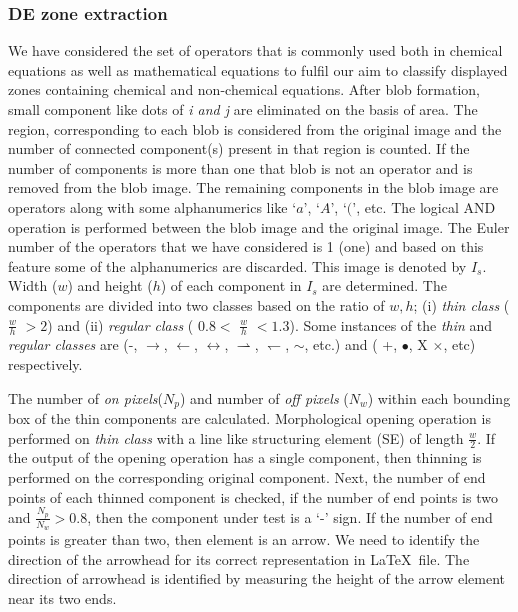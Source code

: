 \subsubsection{DE zone extraction} 
\label{DEZONE}
We have considered the set of operators that is commonly used both in chemical equations as well as mathematical equations to fulfil our aim to classify displayed zones containing chemical and non-chemical equations. After blob formation, small component like dots of \emph{i and j} are eliminated on the basis of area. The region, corresponding to each blob is considered from the original image and the
number of connected component(s) present in that region is counted. If the number of components is more than one that blob is not an operator and is removed from the  blob image.
The remaining components in the blob image are operators along with some alphanumerics like $‘a’$, $‘A’$, $‘(’$, etc. The logical AND operation is performed between the blob image and the original image. The Euler number of the operators that we have considered is 1 (one) and based on this feature some of the alphanumerics are discarded. This image is denoted by $I_s$.
Width ($w$) and height ($h$) of each component in $I_s$ are determined. The components  are divided into two classes based on the ratio of $w, h$;
(i) {\em thin class} ($\frac{w}{h}$ $> 2$) and (ii) {\em regular class} ( $0.8 <$ $\frac{w}{h}$ $< 1.3$). 
Some instances of the \emph{thin}  and \emph{regular classes} are (-,  $\rightarrow$, $\leftarrow$, $\leftrightarrow$,  $\rightharpoonup$, $\leftharpoondown$, $\sim$, etc.) and  ( +, $\bullet$, X $\times$, etc) respectively. 

The number of \emph{on pixels}($N_p$) and number of \emph{off pixels} ($N_w$) within each bounding box of the thin components are calculated. 
Morphological opening operation is performed on {\em thin class} with a line like structuring element (SE) of length $\frac{w}{2}$.
If the output of the opening operation has a single component, then  thinning is performed on the corresponding original component.
Next, the number of end points of each thinned component is checked, if the number of end points is two  and $\frac{N_p}{N_w} > 0.8$, then the component under test is a `-' sign. If the number of end points is greater than two, then  element is an arrow. We need to identify the direction of the arrowhead for its correct representation in  \LaTeX\ file. The direction of arrowhead is identified by measuring the height of the arrow element near its two ends. 

